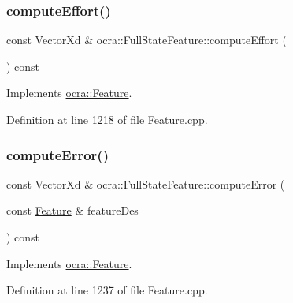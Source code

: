 \subsubsection{\texorpdfstring{compute\+Effort()}{computeEffort()}\hspace{0.1cm}{\footnotesize\ttfamily [2/2]}}
{\footnotesize\ttfamily const Vector\+Xd \& ocra\+::\+Full\+State\+Feature\+::compute\+Effort (\begin{DoxyParamCaption}{ }\end{DoxyParamCaption}) const\hspace{0.3cm}{\ttfamily [virtual]}}



Implements \hyperlink{classocra_1_1Feature_ae43f2ffc54862d6ddc0b02fd39431eb6}{ocra\+::\+Feature}.



Definition at line 1218 of file Feature.\+cpp.

\hypertarget{classocra_1_1FullStateFeature_ab1b5ffc62eba180926f7b90e6318ee6f}{}\label{classocra_1_1FullStateFeature_ab1b5ffc62eba180926f7b90e6318ee6f} 
\subsubsection{\texorpdfstring{compute\+Error()}{computeError()}\hspace{0.1cm}{\footnotesize\ttfamily [1/2]}}
{\footnotesize\ttfamily const Vector\+Xd \& ocra\+::\+Full\+State\+Feature\+::compute\+Error (\begin{DoxyParamCaption}\item[{const \hyperlink{classocra_1_1Feature}{Feature} \&}]{feature\+Des }\end{DoxyParamCaption}) const\hspace{0.3cm}{\ttfamily [virtual]}}



Implements \hyperlink{classocra_1_1Feature_aaa74d6869f7e574fcc39d443581ddf77}{ocra\+::\+Feature}.



Definition at line 1237 of file Feature.\+cpp.

\hypertarget{classocra_1_1FullStateFeature_a8a8e1a72f3aa7b417b5d347eaee69ebb}{}\label{classocra_1_1FullStateFeature_a8a8e1a72f3aa7b417b5d347eaee69ebb} 
